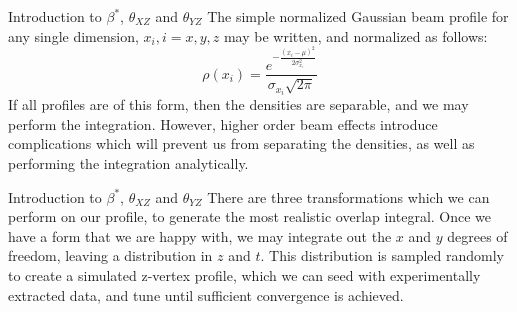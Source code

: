 \begin{frame}{Introduction to $\beta^{*}$,  $\theta_{XZ}$ and $\theta_{YZ}$}
The simple normalized Gaussian beam profile for any single dimension, $x_i, i =
x, y, z$  may be
written, and normalized as follows:
\begin{equation}
\label{eq:simplegaussian}
\rho(x_{i}) = \frac{e^{ -\frac{(x_{i}-\mu)^2}{2\sigma_{x_i}^2}}}{\sigma_{x_i}\sqrt{2\pi}}
\end{equation}
If all profiles are of this form, then the densities are separable, and we may
perform the integration. However, higher order beam effects introduce
complications which will prevent us from separating the densities, as well as
performing the integration analytically.
\end{frame}

\begin{frame}{Introduction to $\beta^{*}$,  $\theta_{XZ}$ and $\theta_{YZ}$}
There are three transformations which we can perform on our profile, to generate
the most realistic overlap integral. Once we have a form that we are happy with,
we may integrate out the $x$ and $y$ degrees of freedom, leaving a distribution
in $z$ and $t$. This distribution is sampled randomly to create a simulated
z-vertex profile, which we can seed with experimentally extracted data, and tune
until sufficient convergence is achieved.
\end{frame}


